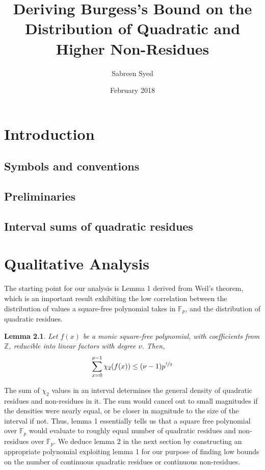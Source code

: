 \documentclass{report}
\title{Deriving Burgess's Bound on the Distribution of Quadratic and Higher Non-Residues}
\author{
  Sabreen Syed\\
  \multicolumn{1}{p{.7\textwidth}}{\centering\emph{Department of Computer Science and Engineering\\
  Indian Institute of Technology Kanpur, India}}}
\date{February 2018}
\newtheorem{lemma}{Lemma}
\begin{document}
\maketitle

\chapter{Introduction}
%
\section{Symbols and conventions}
%
\section{Preliminaries}
%
\section{Interval sums of quadratic residues}
%
\chapter{Qualitative Analysis}
 The starting point for our analysis is Lemma 1 derived from Weil's theorem, which is an important result exhibiting the low correlation between the distribution of values a square-free polynomial takes in $\mathbb{F}_p$, and the distribution of quadratic residues.
%
\begin{lemma}
\cite{burgess}Let $f(x)$ be a monic square-free polynomial, with coefficients from $\mathbb{Z}$, reducible into linear factors with degree $\nu$. Then,
$$\sum\limits_{x=0}^{p-1}\chi_2(f(x))\leq (\nu -1)p^{\nicefrac{1}{2}}$$
\end{lemma}
%
The sum of $\chi_2$ values in an interval determines the general density of quadratic residues and non-residues in it. The sum would cancel out to small magnitudes if the densities were nearly equal, or be closer in magnitude to the size of the interval if not. Thus, lemma 1 essentially tells us that a square free polynomial over $\mathbb{F}_p$ would evaluate to roughly equal number of quadratic residues and non-residues over $\mathbb{F}_p$. We deduce lemma 2 in the next section by constructing an appropriate polynomial exploiting lemma 1 for our purpose of finding low bounds on the number of continuous quadratic residues or continuous non-residues.
%
%
\end{document}

